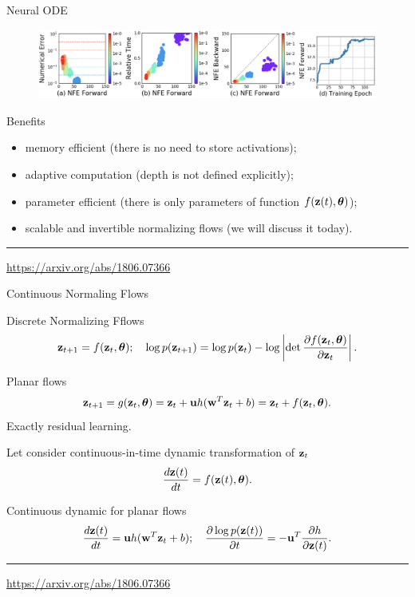 \begin{frame}{Neural ODE}
	
	\begin{figure}
		\centering
		\includegraphics[width=\linewidth]{figs/neural_ode}
	\end{figure}
	
	\begin{block}{Benefits}
		\begin{itemize}
			\item memory efficient (there is no need to store activations);
			\item adaptive computation (depth is not defined explicitly);
			\item parameter efficient (there is only parameters of function $f(\mathbf{z}(t), \boldsymbol{\theta})$);
			\item scalable and invertible normalizing flows (we will discuss it today).
		\end{itemize}
	\end{block}
	\vfill
	\hrule\medskip
	{\scriptsize \href{https://arxiv.org/abs/1806.07366}{https://arxiv.org/abs/1806.07366}}   
\end{frame}
\begin{frame}{Continuous Normaling Flows}
	\begin{block}{Discrete Normalizing Fflows}
		\vspace{-0.4cm}
		  \[
		  \mathbf{z}_{t+1} = f(\mathbf{z}_t, \boldsymbol{\theta}); \quad \log p(\mathbf{z}_{t+1}) = \log p(\mathbf{z}_{t}) - \log \left| \det \frac{\partial f(\mathbf{z}_t, \boldsymbol{\theta})}{\partial \mathbf{z}_{t}} \right| .
		  \]
		\vspace{-0.4cm}
	\end{block}
	\begin{block}{Planar flows}
		\vspace{-0.3cm}
		\[
		\mathbf{z}_{t + 1} = g(\mathbf{z}_t, \boldsymbol{\theta}) = \mathbf{z}_t + \mathbf{u} h(\mathbf{w}^T\mathbf{z}_t + b) = \mathbf{z}_t + f(\mathbf{z}_t, \boldsymbol{\theta}).
		\]
		Exactly residual learning.
	\end{block}
	Let consider continuous-in-time dynamic transformation of $\mathbf{z}_t$
	\[
		\frac{d\mathbf{z}(t)}{dt} = f(\mathbf{z}(t), \boldsymbol{\theta}).
	\]
	\vspace{-0.3cm}
	\begin{block}{Continuous dynamic for planar flows}
		\vspace{-0.3cm}
		\[
			\frac{d\mathbf{z}(t)}{dt}  = \mathbf{u} h(\mathbf{w}^T\mathbf{z}_t + b); \quad \frac{\partial \log p (\mathbf{z}(t))}{ \partial t} = - \mathbf{u}^T \frac{\partial h}{\partial \mathbf{z}(t)}.
		\]
	\end{block}
	\vfill
	\hrule\medskip
	{\scriptsize \href{https://arxiv.org/abs/1806.07366}{https://arxiv.org/abs/1806.07366}} 
\end{frame}
